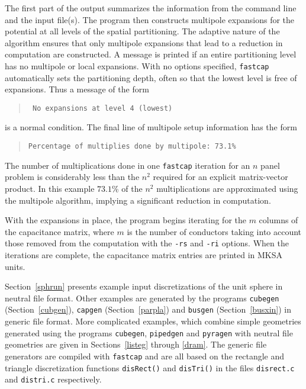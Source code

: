 The first part of the output summarizes the information from the 
command line and
the input file(s). The program then constructs multipole expansions for the
potential  at all levels of the spatial partitioning. The adaptive nature
of the algorithm ensures that only multipole expansions that lead to a
reduction in computation are constructed.
A message is printed
if an entire partitioning level has no multipole or local expansions. With
no options specified, {\tt fastcap} automatically sets the partitioning depth,
often
so that the lowest level is free of expansions. Thus a  message of
the form
\begin{quote}\tt
No expansions at level 4 (lowest)
\end{quote}
is a normal condition. The final line of multipole setup information has
the form
\begin{quote}
\begin{verbatim}
Percentage of multiplies done by multipole: 73.1%
\end{verbatim}
\end{quote}
The number of multiplications done in one {\tt fastcap} iteration for
an $n$ panel problem is 
considerably less than the $n^2$
required for an explicit matrix-vector product. 
In this example $73.1$\% of the $n^2$
multiplications are approximated using the multipole algorithm, implying
a significant reduction in computation. 

With the expansions in place, the program begins iterating for the $m$
columns of the capacitance matrix, where $m$ is the number of
conductors taking into account those removed from the computation
with the {\tt -rs} and {\tt -ri} options. 
When the iterations are complete,
the capacitance matrix entries are printed in MKSA units.

Section~\ref{sphrun} presents 
example input discretizations of the unit sphere in neutral
file format. Other examples are generated by the programs
{\tt cubegen} (Section~\ref{cubgen}), 
{\tt capgen} (Section~\ref{parpla}) and {\tt busgen} (Section~\ref{busxin})
in generic file format.  More complicated examples, which combine
simple geometries generated using
the programs {\tt cubegen}, {\tt pipedgen} and {\tt pyragen} with
neutral file geometries
are given in
Sections~\ref{listeg} through \ref{dram}.
The generic file generators are compiled with {\tt fastcap} and are all
based on the rectangle and triangle
discretization functions  {\tt disRect()} and {\tt disTri()} in the
files {\tt disrect.c} and {\tt distri.c} respectively.

